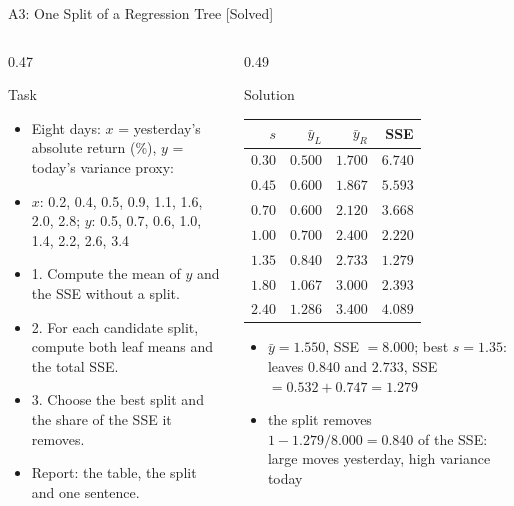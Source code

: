 \begin{frame}{A3: One Split of a Regression Tree [Solved]}
\itemsize{\scriptsize}
\begin{columns}[T]
\begin{column}{0.47\textwidth}
\begin{block}{Task}
\begin{itemize}
    \item Eight days: $x$ = yesterday's absolute return (\%), $y$ = today's variance proxy:
    \item $x$: 0.2, 0.4, 0.5, 0.9, 1.1, 1.6, 2.0, 2.8; $y$: 0.5, 0.7, 0.6, 1.0, 1.4, 2.2, 2.6, 3.4
    \item 1. Compute the mean of $y$ and the SSE without a split.
    \item 2. For each candidate split, compute both leaf means and the total SSE.
    \item 3. Choose the best split and the share of the SSE it removes.
    \item Report: the table, the split and one sentence.
\end{itemize}
\end{block}
\end{column}
\begin{column}{0.49\textwidth}
\begin{exampleblock}{Solution}
\begin{center}
\tiny
\begin{tabular}{rrrr}
\toprule
$s$ & $\bar y_L$ & $\bar y_R$ & SSE \\
\midrule
$0.30$ & $0.500$ & $1.700$ & $6.740$ \\
$0.45$ & $0.600$ & $1.867$ & $5.593$ \\
$0.70$ & $0.600$ & $2.120$ & $3.668$ \\
$1.00$ & $0.700$ & $2.400$ & $2.220$ \\
$1.35$ & $0.840$ & $2.733$ & $1.279$ \\
$1.80$ & $1.067$ & $3.000$ & $2.393$ \\
$2.40$ & $1.286$ & $3.400$ & $4.089$ \\
\bottomrule
\end{tabular}
\end{center}
\begin{itemize}
    \item $\bar y = 1.550$, SSE $= 8.000$; best $s = 1.35$: leaves $0.840$ and $2.733$, SSE $= 0.532 + 0.747 = 1.279$
    \item the split removes $1 - 1.279/8.000 = 0.840$ of the SSE: large moves yesterday, high variance today
\end{itemize}
\end{exampleblock}
\end{column}
\end{columns}
\end{frame}

